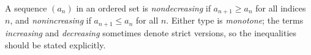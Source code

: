 
A sequence $(a_n)$ in an ordered set is \emph{nondecreasing} if $a_{n+1}\ge a_n$ for all indices $n$, and \emph{nonincreasing} if $a_{n+1}\le a_n$ for all $n$. Either type is \emph{monotone}; the terms \emph{increasing} and \emph{decreasing} sometimes denote strict versions, so the inequalities should be stated explicitly.

